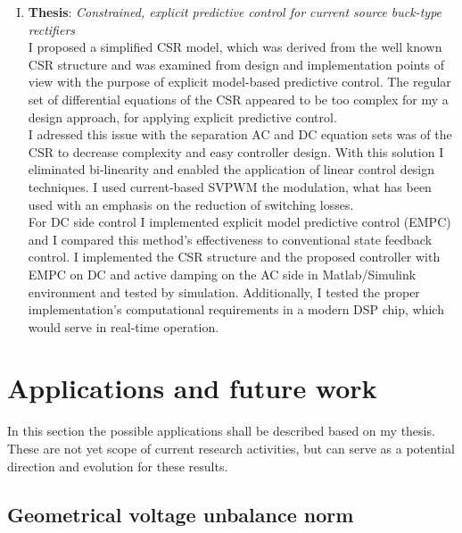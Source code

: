 \begin{enumerate}[I.)]
		\item\textbf{Thesis}: \emph{Constrained, explicit predictive control for current source buck-type rectifiers}\\
    I proposed a simplified CSR model, which was derived from the well known CSR structure and was examined from design and implementation points of view with the purpose of explicit model-based predictive control. The regular set of differential equations of the CSR appeared to be too complex for my a design approach, for applying explicit predictive control. \\
		I adressed this issue with the separation AC and DC equation sets was of the CSR to decrease complexity and easy controller design. With this solution I eliminated bi-linearity and enabled the application of linear control design techniques. I used current-based SVPWM the modulation, what has been used with an emphasis on the reduction of switching losses. \\
		For DC side control I implemented explicit model predictive control (EMPC) and I compared this method's effectiveness to conventional state feedback control. I implemented the CSR structure and the proposed controller with EMPC on DC and active damping on the AC side in Matlab/Simulink environment and tested by simulation. Additionally, I tested the proper implementation's computational requirements in a modern DSP chip, which would serve in real-time operation.\\
	
\end{enumerate}


		\section{Applications and future work}
		
		In this section the possible applications shall be described based on my thesis. These are not yet scope of current research activities, but can serve as a potential direction and evolution for these results.
		
		\subsection{Geometrical voltage unbalance norm}
		
